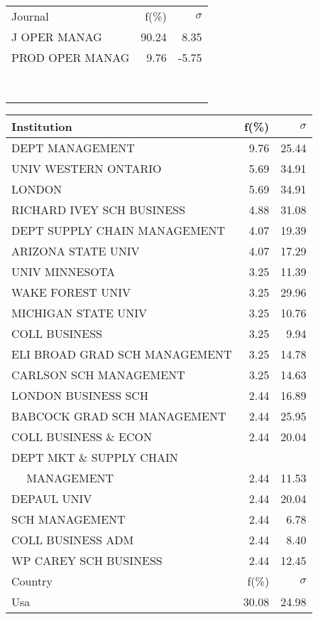 \documentclass[a4paper,11pt]{report}
\begin{document}
\begin{landscape}
\begin{table}[!ht]
{\begin{tabular}{|l r  r|}
 &  & \\
\hline
\hline
Journal & f(\%) & $\sigma$\\
\hline
J OPER MANAG & 90.24 & 8.35\\
PROD OPER MANAG & 9.76 & -5.75\\
 &  & \\
 &  & \\
 &  & \\
 &  & \\
 &  & \\
 &  & \\
 &  & \\
 &  & \\
\hline
\end{tabular}
}
{\scriptsize\begin{tabular}{|l r r|}
\hline
Institution & f(\%) & $\sigma$\\
\hline
DEPT MANAGEMENT & 9.76 & 25.44\\
UNIV WESTERN ONTARIO & 5.69 & 34.91\\
LONDON & 5.69 & 34.91\\
RICHARD IVEY SCH BUSINESS & 4.88 & 31.08\\
DEPT SUPPLY CHAIN MANAGEMENT & 4.07 & 19.39\\
ARIZONA STATE UNIV & 4.07 & 17.29\\
UNIV MINNESOTA & 3.25 & 11.39\\
WAKE FOREST UNIV & 3.25 & 29.96\\
MICHIGAN STATE UNIV & 3.25 & 10.76\\
COLL BUSINESS & 3.25 & 9.94\\
ELI BROAD GRAD SCH MANAGEMENT & 3.25 & 14.78\\
CARLSON SCH MANAGEMENT & 3.25 & 14.63\\
LONDON BUSINESS SCH & 2.44 & 16.89\\
BABCOCK GRAD SCH MANAGEMENT & 2.44 & 25.95\\
COLL BUSINESS \& ECON & 2.44 & 20.04\\
DEPT MKT \& SUPPLY CHAIN &  & \\
$\quad$ MANAGEMENT & 2.44 & 11.53\\
DEPAUL UNIV & 2.44 & 20.04\\
SCH MANAGEMENT & 2.44 & 6.78\\
COLL BUSINESS ADM & 2.44 & 8.40\\
WP CAREY SCH BUSINESS & 2.44 & 12.45\\
\hline
\hline
Country & f(\%) & $\sigma$\\
\hline
Usa & 30.08 & 24.98\\

\end{tabular}}
\end{table}
\end{landscape}
\end{document}
